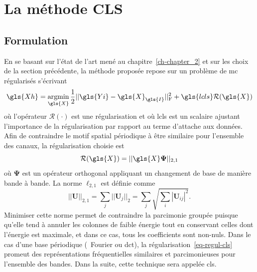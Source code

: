 %
\section{La méthode CLS}

\subsection{Formulation}\label{sec-formulation-cls}

En se basant sur l'état de l'art mené au chapitre~\ref{ch-chapter_2} et sur les choix de la section précédente, la méthode proposée repose sur un problème de \gls{mc} régularisés s'écrivant 
\begin{equation}\label{eq-cls-formulation}
    \gls{Xh}=\argmin_{\gls{X}} \frac{1}{2} \frobnorm{\gls{Yi} - \gls{X}_{\gls{I}}} + \gls{lcls} \mathcal{R}(\gls{X})
\end{equation}
où l'opérateur $\mathcal{R}(\cdot)$ est une régularisation et où \gls{lcls} est un scalaire ajustant l'importance de la régularisation par rapport au terme d'attache aux données. Afin de contraindre le motif spatial périodique à être similaire pour l'ensemble des canaux, la régularisation choisie est
\begin{equation}\label{eq-regul-cls}
    \mathcal{R}(\gls{X}) = ||\gls{X}\boldsymbol\Psi||_{2, 1}
\end{equation}
où $\boldsymbol\Psi$ est un opérateur orthogonal appliquant un changement de base de manière bande à bande. La norme $\ell_{2, 1}$ est définie comme~\cite{kowalski2009sparse}%
\begin{equation}
||\mathbf{U}||_{2, 1} = \sum_j||\mathbf{U}_j||_2 = \sum_j \sqrt{\sum_i |\mathbf{U}_{ij}|^2}.
\end{equation}
Minimiser cette norme permet de contraindre la parcimonie groupée puisque qu'elle tend à annuler les colonnes de faible énergie tout en conservant celles dont l'énergie est maximale, et dans ce cas, tous les coefficients sont non-nuls. Dans le cas d'une base périodique (\eg\ Fourier ou \gls{dct}), la régularisation~\eqref{eq-regul-cls} promeut des représentations fréquentielles similaires et parcimonieuses pour l'ensemble des bandes. Dans la suite, cette technique sera appelée \gls{cls}.

